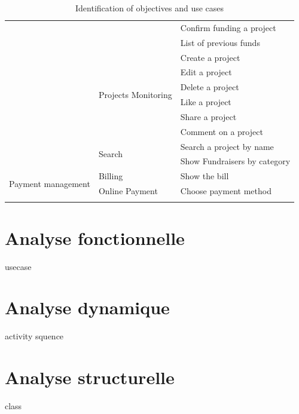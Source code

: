 \begin{longtable}{|m{10em}|m{10em}|m{10em}|}
                                               &                                       & Confirm funding a project               \\\cline{3-3}
                                               &                                       & List of previous funds                  \\\cline{2-3}
                                               & \multirow{6}{*}{Projects Monitoring}  & Create a project                        \\\cline{3-3}
                                               &                                       & Edit a project                          \\\cline{3-3}
                                               &                                       & Delete a project                        \\\cline{3-3}
                                               &                                       & Like a project                          \\\cline{3-3}
                                               &                                       & Share a project                         \\\cline{3-3}
                                               &                                       & Comment on a project                    \\\cline{2-3}
                                               & \multirow{2}{*}{Search}               & Search a project by name                \\\cline{3-3}
                                               &                                       & Show Fundraisers by category            \\\hline
    \multirow{2}{*}{Payment management}        & \multirow{1}{*}{Billing}              & Show the bill                           \\\cline{2-3}
                                               & \multirow{1}{*}{Online Payment}       & Choose payment method                   \\\hline

    \caption{Identification of objectives and use cases}
    \label{tab:id_objec_uc}
\end{longtable}

\section{Analyse fonctionnelle}
usecase
\section{Analyse dynamique}
activity  squence
\section{Analyse structurelle}
class